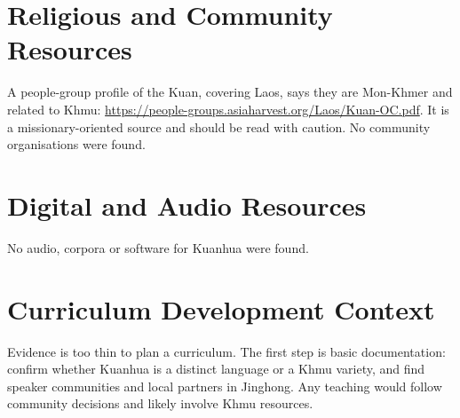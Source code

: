 \documentclass[12pt]{article}
\begin{document}
\section{Religious and Community Resources}
A people-group profile of the Kuan, covering Laos, says they are Mon-Khmer and related to Khmu: \url{https://people-groups.asiaharvest.org/Laos/Kuan-OC.pdf}. It is a missionary-oriented source and should be read with caution. No community organisations were found.

\section{Digital and Audio Resources}
No audio, corpora or software for Kuanhua were found.

\section{Curriculum Development Context}
Evidence is too thin to plan a curriculum. The first step is basic documentation: confirm whether Kuanhua is a distinct language or a Khmu variety, and find speaker communities and local partners in Jinghong. Any teaching would follow community decisions and likely involve Khmu resources.
\end{document}
